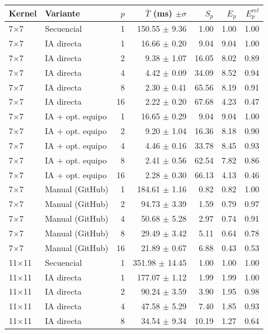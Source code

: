 \begin{tabular}{llrrrrr}
\toprule
Kernel & Variante & $p$ & $\bar{T}$ (ms) $\pm\sigma$ & $S_p$ & $E_p$ & $E^{rel}_p$ \\
\midrule
7$\times$7 & Secuencial & 1 & 150.55 $\pm$ 9.36 & 1.00 & 1.00 & 1.00 \\
7$\times$7 & IA directa & 1 & 16.66 $\pm$ 0.20 & 9.04 & 9.04 & 1.00 \\
7$\times$7 & IA directa & 2 & 9.38 $\pm$ 1.07 & 16.05 & 8.02 & 0.89 \\
7$\times$7 & IA directa & 4 & 4.42 $\pm$ 0.09 & 34.09 & 8.52 & 0.94 \\
7$\times$7 & IA directa & 8 & 2.30 $\pm$ 0.41 & 65.56 & 8.19 & 0.91 \\
7$\times$7 & IA directa & 16 & 2.22 $\pm$ 0.20 & 67.68 & 4.23 & 0.47 \\
7$\times$7 & IA + opt. equipo & 1 & 16.65 $\pm$ 0.29 & 9.04 & 9.04 & 1.00 \\
7$\times$7 & IA + opt. equipo & 2 & 9.20 $\pm$ 1.04 & 16.36 & 8.18 & 0.90 \\
7$\times$7 & IA + opt. equipo & 4 & 4.46 $\pm$ 0.16 & 33.78 & 8.45 & 0.93 \\
7$\times$7 & IA + opt. equipo & 8 & 2.41 $\pm$ 0.56 & 62.54 & 7.82 & 0.86 \\
7$\times$7 & IA + opt. equipo & 16 & 2.28 $\pm$ 0.30 & 66.13 & 4.13 & 0.46 \\
7$\times$7 & Manual (GitHub) & 1 & 184.61 $\pm$ 1.16 & 0.82 & 0.82 & 1.00 \\
7$\times$7 & Manual (GitHub) & 2 & 94.73 $\pm$ 3.39 & 1.59 & 0.79 & 0.97 \\
7$\times$7 & Manual (GitHub) & 4 & 50.68 $\pm$ 5.28 & 2.97 & 0.74 & 0.91 \\
7$\times$7 & Manual (GitHub) & 8 & 29.49 $\pm$ 3.42 & 5.11 & 0.64 & 0.78 \\
7$\times$7 & Manual (GitHub) & 16 & 21.89 $\pm$ 0.67 & 6.88 & 0.43 & 0.53 \\
\midrule
11$\times$11 & Secuencial & 1 & 351.98 $\pm$ 14.45 & 1.00 & 1.00 & 1.00 \\
11$\times$11 & IA directa & 1 & 177.07 $\pm$ 1.12 & 1.99 & 1.99 & 1.00 \\
11$\times$11 & IA directa & 2 & 90.24 $\pm$ 3.59 & 3.90 & 1.95 & 0.98 \\
11$\times$11 & IA directa & 4 & 47.58 $\pm$ 5.29 & 7.40 & 1.85 & 0.93 \\
11$\times$11 & IA directa & 8 & 34.54 $\pm$ 9.34 & 10.19 & 1.27 & 0.64 \\

\end{tabular}

